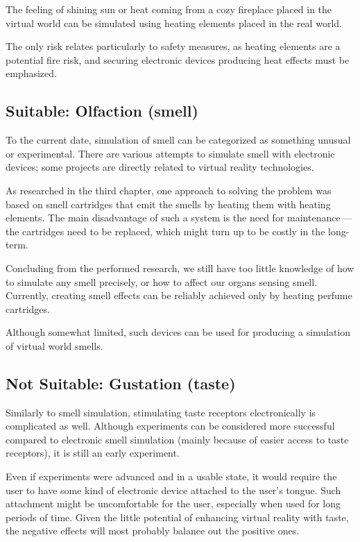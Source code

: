 The feeling of shining sun or heat coming from a cozy fireplace placed in the
virtual world can be simulated using heating elements placed in the real world.

The only risk relates particularly to safety measures, as heating elements are
a potential fire risk, and securing electronic devices producing heat effects
must be emphasized.


\hypertarget{x-suitable:-olfaction-(smell)}{\subsection{Suitable: Olfaction (smell)}}
To the current date, simulation of smell can be categorized as something unusual
or experimental. There are various attempts to simulate smell with electronic
devices; some projects are directly related to virtual reality technologies.


As researched in the third chapter,
one approach to solving the problem was based on smell
cartridges that emit the smells by heating them with heating elements.
The main disadvantage of such a system is the need for maintenance — the
cartridges need to be replaced, which might turn up to be costly in the
long-term.


Concluding from the performed research, we still have too little
knowledge of how to simulate any smell precisely, or how to affect our organs
sensing smell. Currently, creating smell effects can be reliably achieved
only by heating perfume cartridges.


Although somewhat limited, such devices can be used for producing a simulation
of virtual world smells.


\hypertarget{x-not-suitable:-gustation-(taste)}{\subsection{Not Suitable: Gustation (taste)}}
Similarly to smell simulation, stimulating taste receptors electronically is
complicated as well. Although experiments can be considered more successful
compared to electronic smell simulation (mainly because of easier access
to taste receptors), it is still an early experiment. \cite{stsie}


Even if experiments were advanced and in a usable state, it would
require the user to have some kind of electronic device attached to the user’s
tongue. Such attachment might be uncomfortable for the user, especially when
used for long periods of time. Given the little potential of enhancing virtual
reality with taste, the negative effects will most probably balance out
the positive ones.


